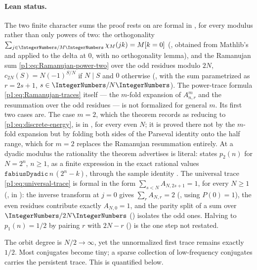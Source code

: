 \documentclass[11pt,oneside]{article}
\theoremstyle{definition}
\theoremstyle{remark}
\begin{document}
\paragraph{Lean status.}
The two finite character sums the proof rests on are formal in
, for every modulus rather than only powers of two: the
orthogonality \(\sum_{j\in\IntegerNumbers/M\IntegerNumbers}\chi_M(jk)=M[k=0]\)
(, obtained from Mathlib's  and
 applied to the delta at \(0\), with no orthogonality lemma), and the
Ramanujan sum \eqref{p1:eq:Ramanujan-power-two} over the odd residues modulo \(2N\),
\(c_{2N}(S)=N(-1)^{S/N}\) if \(N\mid S\) and \(0\) otherwise
(, with  the sum
parametrized as \(r=2s+1\), \(s\in\IntegerNumbers/N\IntegerNumbers\)).  The power-trace
formula \eqref{p1:eq:Ramanujan-traces} itself --- the \(m\)-fold expansion of
\(A_{n,r}^m\) and the resummation over the odd residues --- is not formalized for general
\(m\).  Its first two cases are.  The case \(m=2\), which the theorem records as reducing to
\eqref{p1:eq:discrete-energy}, is  in
, for every even \(N\); it is proved there not by the \(m\)-fold
expansion but by folding both sides of the Parseval identity onto the half range, which for
\(m=2\) replaces the Ramanujan resummation entirely.  At a dyadic modulus the rationality the
theorem advertises is literal:
 states \(p_2(n)\) for \(N=2^n\), \(n\ge1\),
as a finite expression in the exact rational values \(\mathtt{fabiusDyadic}\,n\,(2^n-k)\),
through the sample identity .  The universal trace
\eqref{p1:eq:universal-trace} is formal in the form
\(\sum_{s<N}A_{N,2s+1}=1\), for every \(N\ge1\)
(, in ): the
inverse transform at \(j=0\) gives \(\sum_{r}A_{N,r}=2\)
(, using \(P(0)=1\)), the even residues contribute
exactly \(A_{N,0}=1\), and the parity split of a sum over
\(\IntegerNumbers/2N\IntegerNumbers\) ()
isolates the odd ones.  Halving to \(p_1(n)=1/2\) by pairing \(r\) with \(2N-r\)
() is the one step not restated.

\begin{remark}
The orbit degree is $N/2\to\infty$, yet the unnormalized first trace remains
exactly $1/2$.  Most conjugates become tiny; a sparse collection of low-frequency
conjugates carries the persistent trace.  This is quantified below.
\end{remark}
\end{document}

